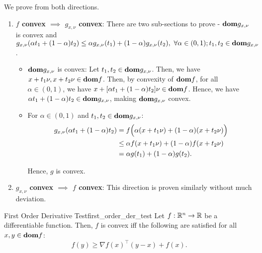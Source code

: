 \begin{proof*}
	We prove from both directions.
	\begin{enumerate}[label=(\roman*)]
		\item \textbf{$f$ convex $\implies$ $g_{x, \nu}$ convex}: There are two sub-sections to prove - ${\mathrm{\bf dom}} g_{x,\nu}$ is convex and $g_{x, \nu}(\alpha t_1 + (1-\alpha)t_2)\le \alpha g_{x, \nu}(t_1) + (1-\alpha)g_{x, \nu}(t_2), \ \forall \alpha\in(0,1); t_1, t_2\in {\mathrm{\bf dom}} g_{x, \nu}$.	
		\begin{itemize}
			\item ${\mathrm{\bf dom}} g_{x, \nu}$ is convex: Let $t_1, t_2\in{\mathrm{\bf dom}} g_{x, \nu}$. Then, we have $x+t_1\nu, x+t_2\nu\in{\mathrm{\bf dom}} f$. Then, by convexity of ${\mathrm{\bf dom}} f$, for all $\alpha\in(0,1)$, we have $x+[\alpha t_1 + (1-\alpha)t_2]\nu\in{\mathrm{\bf dom}} f$. Hence, we have $\alpha t_1 + (1-\alpha)t_2\in{\mathrm{\bf dom}} g_{x, \nu}$, making ${\mathrm{\bf dom}} g_{x, \nu}$ convex.

			\item For $\alpha\in(0,1)$ and $t_1, t_2\in {\mathrm{\bf dom}} g_{x, \nu}$: 
			\begin{align*}
				g_{x,\nu}(\alpha t_1 + (1-\alpha)t_2) &= f\Big( 
					\alpha(x+t_1\nu) + (1-\alpha)(x+t_2\nu)
				 \Big) \\
				&\le \alpha f(x+t_1\nu) + (1-\alpha)f(x+t_2\nu)\\
				&= \alpha g(t_1) + (1-\alpha)g(t_2).
			\end{align*} 

			\noindent Hence, $g$ is convex.
		\end{itemize} 
		\item \textbf{$g_{x,\nu}$ convex $\implies$ $f$ convex}: This direction is proven similarly without much deviation.
	\end{enumerate} 	
\end{proof*} 

\begin{proposition}{First Order Derivative Test}{first_order_der_test}
	Let $f:\mathbb{R}^n\to\mathbb{R}$ be a differentiable function. Then, $f$ is convex iff the following are satisfied for all $x, y\in{\mathrm{\bf dom}} f$:
	\begin{equation}
		\label{eq:first_order_der_test}
		f(y) \ge \nabla f(x)^\top (y-x) + f(x).
	\end{equation} 
\end{proposition} 

